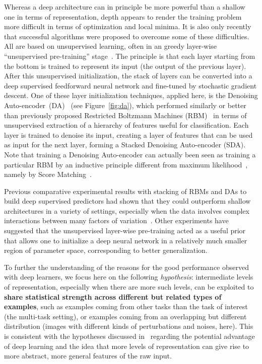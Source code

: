 \documentclass{article} %
\begin{document}
Whereas a deep architecture can in principle be more powerful than a
shallow one in terms of representation, depth appears to render the
training problem more difficult in terms of optimization and local minima.
It is also only recently that successful algorithms were proposed to
overcome some of these difficulties.  All are based on unsupervised
learning, often in an greedy layer-wise ``unsupervised pre-training''
stage~\citep{Bengio-2009}.  
The principle is that each layer starting from
the bottom is trained to represent its input (the output of the previous
layer). After this
unsupervised initialization, the stack of layers can be
converted into a deep supervised feedforward neural network and fine-tuned by
stochastic gradient descent.
One of these layer initialization techniques,
applied here, is the Denoising
Auto-encoder~(DA)~\citep{VincentPLarochelleH2008-very-small} (see
Figure~\ref{fig:da}), which performed similarly or 
better~\citep{VincentPLarochelleH2008-very-small} than previously
proposed Restricted Boltzmann Machines (RBM)~\citep{Hinton06} 
in terms of unsupervised extraction
of a hierarchy of features useful for classification. Each layer is trained
to denoise its input, creating a layer of features that can be used as
input for the next layer, forming a Stacked Denoising Auto-encoder (SDA).
Note that training a Denoising Auto-encoder
can actually been seen as training a particular RBM by an inductive
principle different from maximum likelihood~\citep{Vincent-SM-2010}, 
namely by Score Matching~\citep{Hyvarinen-2005,HyvarinenA2008}. 

Previous comparative experimental results with stacking of RBMs and DAs
to build deep supervised predictors had shown that they could outperform
shallow architectures in a variety of settings, especially
when the data involves complex interactions between many factors of 
variation~\citep{LarochelleH2007,Bengio-2009}. Other experiments have suggested
that the unsupervised layer-wise pre-training acted as a useful
prior~\citep{Erhan+al-2010} that allows one to initialize a deep
neural network in a relatively much smaller region of parameter space, 
corresponding to better generalization.

To further the understanding of the reasons for the good performance
observed with deep learners, we focus here on the following {\em hypothesis}:
intermediate levels of representation, especially when there are
more such levels, can be exploited to {\bf share
statistical strength across different but related types of examples},
such as examples coming from other tasks than the task of interest
(the multi-task setting), or examples coming from an overlapping
but different distribution (images with different kinds of perturbations
and noises, here). This is consistent with the hypotheses discussed
in~\citet{Bengio-2009} regarding the potential advantage
of deep learning and the idea that more levels of representation can
give rise to more abstract, more general features of the raw input.
\end{document}
